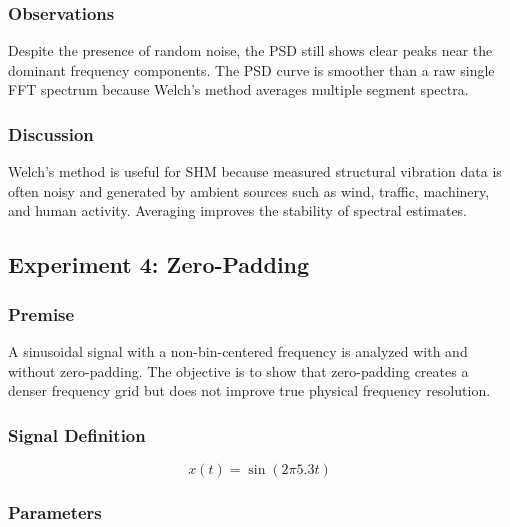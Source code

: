 \documentclass[11pt,a4paper]{article}
\begin{document}
\subsubsection{Observations}

Despite the presence of random noise, the PSD still shows clear peaks near the dominant frequency components. The PSD curve is smoother than a raw single FFT spectrum because Welch's method averages multiple segment spectra.

\subsubsection{Discussion}

Welch's method is useful for SHM because measured structural vibration data is often noisy and generated by ambient sources such as wind, traffic, machinery, and human activity. Averaging improves the stability of spectral estimates.

\subsection{Experiment 4: Zero-Padding}

\subsubsection{Premise}

A sinusoidal signal with a non-bin-centered frequency is analyzed with and without zero-padding. The objective is to show that zero-padding creates a denser frequency grid but does not improve true physical frequency resolution.

\subsubsection{Signal Definition}

\begin{equation}
    x(t) =
    \sin(2\pi 5.3t)
\end{equation}

\subsubsection{Parameters}
\end{document}
